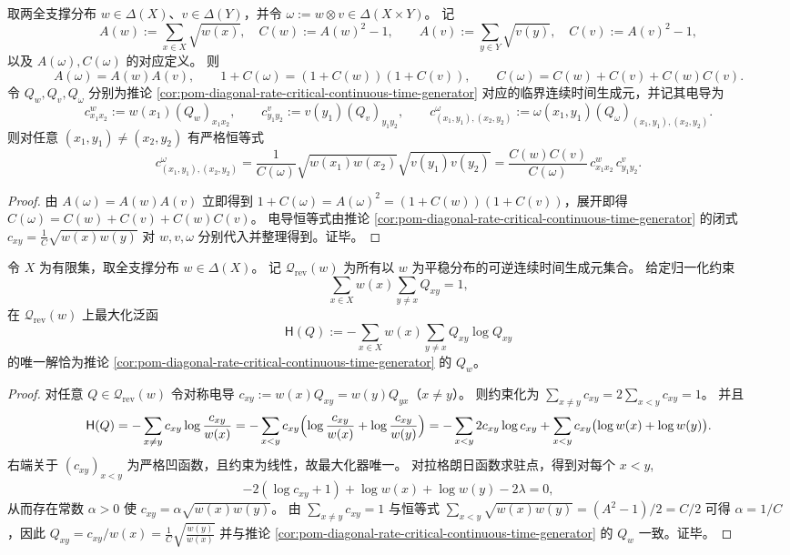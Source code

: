 \begin{corollary}[张量积下的电导核乘法闭合]\label{cor:pom-diagonal-rate-critical-conductance-tensor-multiplicativity}
取两全支撑分布 \(w\in\Delta(X)\)、\(v\in\Delta(Y)\)，并令 \(\omega:=w\otimes v\in\Delta(X\times Y)\)。
记
\[
A(w):=\sum_{x\in X}\sqrt{w(x)},\quad C(w):=A(w)^2-1,
\qquad
A(v):=\sum_{y\in Y}\sqrt{v(y)},\quad C(v):=A(v)^2-1,
\]
以及 \(A(\omega),C(\omega)\) 的对应定义。
则
\[
A(\omega)=A(w)A(v),\qquad
1+C(\omega)=(1+C(w))(1+C(v)),
\qquad
C(\omega)=C(w)+C(v)+C(w)C(v).
\]
令 \(Q_w,Q_v,Q_\omega\) 分别为推论 \ref{cor:pom-diagonal-rate-critical-continuous-time-generator} 对应的临界连续时间生成元，并记其电导为
\[
c^w_{x_1x_2}:=w(x_1)(Q_w)_{x_1x_2},\qquad
c^v_{y_1y_2}:=v(y_1)(Q_v)_{y_1y_2},\qquad
c^\omega_{(x_1,y_1),(x_2,y_2)}:=\omega(x_1,y_1)(Q_\omega)_{(x_1,y_1),(x_2,y_2)}.
\]
则对任意 \((x_1,y_1)\ne(x_2,y_2)\) 有严格恒等式
\[
c^\omega_{(x_1,y_1),(x_2,y_2)}
=\frac{1}{C(\omega)}\sqrt{w(x_1)w(x_2)}\sqrt{v(y_1)v(y_2)}
=\frac{C(w)C(v)}{C(\omega)}\,c^w_{x_1x_2}\,c^v_{y_1y_2}.
\]
\end{corollary}
\begin{proof}
由 \(A(\omega)=A(w)A(v)\) 立即得到 \(1+C(\omega)=A(\omega)^2=(1+C(w))(1+C(v))\)，展开即得 \(C(\omega)=C(w)+C(v)+C(w)C(v)\)。
电导恒等式由推论 \ref{cor:pom-diagonal-rate-critical-continuous-time-generator} 的闭式
\(
c_{xy}=\frac{1}{C}\sqrt{w(x)w(y)}
\)
对 \(w,v,\omega\) 分别代入并整理得到。证毕。
\end{proof}

\begin{theorem}[固定平均跳跃率约束下的熵极大可逆生成元]\label{thm:pom-diagonal-rate-critical-continuous-time-generator-maxent}
令 \(X\) 为有限集，取全支撑分布 \(w\in\Delta(X)\)。
记 \(\mathcal Q_{\mathrm{rev}}(w)\) 为所有以 \(w\) 为平稳分布的可逆连续时间生成元集合。
给定归一化约束
\[
\sum_{x\in X}w(x)\sum_{y\ne x}Q_{xy}=1,
\]
在 \(\mathcal Q_{\mathrm{rev}}(w)\) 上最大化泛函
\[
\mathsf H(Q):=-\sum_{x\in X}w(x)\sum_{y\ne x}Q_{xy}\log Q_{xy}
\]
的唯一解恰为推论 \ref{cor:pom-diagonal-rate-critical-continuous-time-generator} 的 \(Q_w\)。
\end{theorem}
\begin{proof}
对任意 \(Q\in\mathcal Q_{\mathrm{rev}}(w)\) 令对称电导 \(c_{xy}:=w(x)Q_{xy}=w(y)Q_{yx}\)（\(x\ne y\)）。
则约束化为
\(
\sum_{x\ne y}c_{xy}=2\sum_{x<y}c_{xy}=1
\)。
并且
\[
\mathsf H(Q)
=-\sum_{x\ne y}c_{xy}\log\frac{c_{xy}}{w(x)}
=-\sum_{x<y}c_{xy}\Bigl(\log\frac{c_{xy}}{w(x)}+\log\frac{c_{xy}}{w(y)}\Bigr)
=-\sum_{x<y}2c_{xy}\log c_{xy}+\sum_{x<y}c_{xy}\bigl(\log w(x)+\log w(y)\bigr).
\]
右端关于 \((c_{xy})_{x<y}\) 为严格凹函数，且约束为线性，故最大化器唯一。
对拉格朗日函数求驻点，得到对每个 \(x<y\),
\[
-2(\log c_{xy}+1)+\log w(x)+\log w(y)-2\lambda=0,
\]
从而存在常数 \(\alpha>0\) 使
\(
c_{xy}=\alpha\sqrt{w(x)w(y)}
\)。
由 \(\sum_{x\ne y}c_{xy}=1\) 与恒等式
\(
\sum_{x<y}\sqrt{w(x)w(y)}=(A^2-1)/2=C/2
\)
可得 \(\alpha=1/C\)，因此
\(
Q_{xy}=c_{xy}/w(x)=\frac{1}{C}\sqrt{\frac{w(y)}{w(x)}}
\)
并与推论 \ref{cor:pom-diagonal-rate-critical-continuous-time-generator} 的 \(Q_w\) 一致。证毕。
\end{proof}


